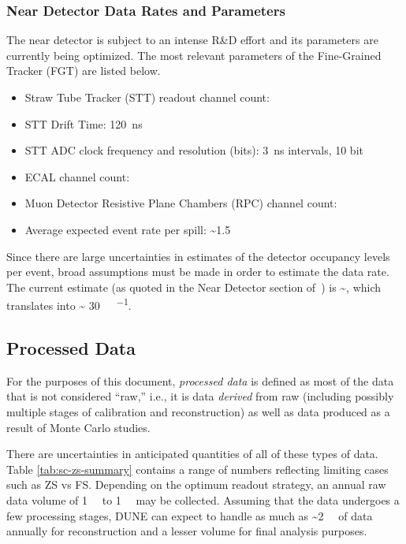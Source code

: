 \subsubsection{Near Detector Data Rates and Parameters}
The near detector is subject to an intense R\&D effort and
its parameters are currently being optimized. The
most relevant parameters of the Fine-Grained Tracker (FGT) are listed below.
\begin{itemize}
\item Straw Tube Tracker (STT) readout channel count: \ndsstchannels
\item STT Drift Time: 120~ns
\item STT ADC clock frequency and resolution (bits): \SI{3}{\ns} intervals, 10 bit
\item ECAL channel count: \ndecalchannels
\item Muon Detector Resistive Plane Chambers (RPC) channel count: \ndmuidchannels
\item Average expected event rate per spill: \textasciitilde 1.5
\end{itemize}
Since there are large uncertainties in estimates of the detector
occupancy levels per event, broad assumptions must be made in order to
estimate the data rate. The current estimate (as quoted in the Near
Detector section of~\cite{cdr-annex-rates}) is
\textasciitilde \nddatarate, which translates into \textasciitilde
\SI{30}{\tera\byte\per\year}.


\subsection{Processed Data}
\label{sec:detectors-sc-infrastructure-processed-data}
For the purposes of this document, \textit{processed data} is defined as most of the
data that is not considered ``raw,'' i.e., it is data \textit{derived} from raw 
(including possibly multiple stages of calibration and reconstruction)
as well as data produced as a result of Monte Carlo studies.

There are uncertainties in anticipated quantities of all of these
types of data. Table \ref{tab:sc-zs-summary} contains a range of
numbers reflecting limiting cases such as ZS vs FS.  Depending on the
optimum readout strategy, an annual raw data volume of
\SI{1}{\tera\byte} to \SI{1}{\peta\byte} may be collected.  Assuming
that the data undergoes a few processing stages, DUNE %
can expect %
to handle as much as \textasciitilde \SI{2}{\peta\byte} of data
annually for reconstruction and a lesser volume for final analysis
purposes.

